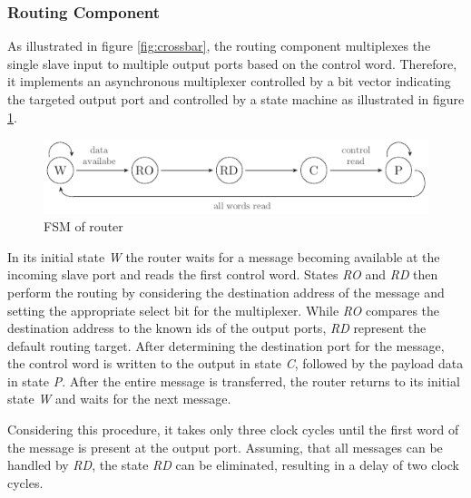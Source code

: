 \subsubsection{Routing Component}
As illustrated in figure \ref{fig:crossbar}, the routing component multiplexes
the single slave input to multiple output ports based on the control word.
Therefore, it implements an asynchronous multiplexer controlled by a bit
vector indicating the targeted output port and controlled by a state machine
as illustrated in figure \ref{fig:router_fsm}.
\begin{figure}[tb]
	\centering
	\includegraphics[width=12cm]{../figures/router_fsm}
	\caption{\acs{FSM} of router}
	\label{fig:router_fsm}
\end{figure}
In its initial state \emph{W} the router waits for a message becoming
available at the incoming slave port and reads the first control word. States
\emph{RO} and \emph{RD} then perform the routing by considering the
destination address of the message and setting the appropriate select bit for
the multiplexer. While \emph{RO} compares the destination address to the known
ids of the output ports, \emph{RD} represent the default routing target. After
determining the destination port for the message, the control word is written
to the output in state \emph{C}, followed by the payload data in state
\emph{P}. After the entire message is transferred, the router returns to its
initial state \emph{W} and waits for the next message.

Considering this procedure, it takes only three clock cycles until the first
word of the message is present at the output port. Assuming, that all messages
can be handled by \emph{RD}, the state \emph{RD} can be eliminated, resulting
in a delay of two clock cycles.

